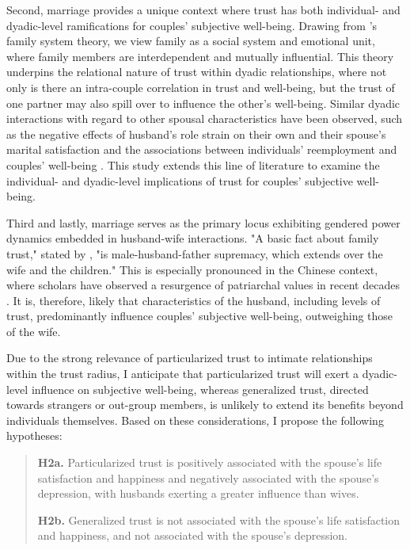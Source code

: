 Second, marriage provides a unique context where trust has both individual- and dyadic-level ramifications for couples' subjective well-being. Drawing from \citeauthor{bowenUseFamilyTheory1966}'s \citeyear{bowenUseFamilyTheory1966} family system theory, we view family as a social system and emotional unit, where family members are interdependent and mutually influential. This theory underpins the relational nature of trust within dyadic relationships, where not only is there an intra-couple correlation in trust and well-being, but the trust of one partner may also spill over to influence the other's well-being. Similar dyadic interactions with regard to other spousal characteristics have been observed, such as the negative effects of husband's role strain on their own and their spouse's marital satisfaction \parencite{brockLongitudinalInvestigationStress2008} and the associations between individuals' reemployment and couples' well-being \parencite{scheuringDoesFixedTermEmployment2021}. This study extends this line of literature to examine the individual- and dyadic-level implications of trust for couples' subjective well-being.

Third and lastly, marriage serves as the primary locus exhibiting gendered power dynamics embedded in husband-wife interactions. "A basic fact about family trust," stated by \textcite[p~27]{barberLogicLimitsTrust1983}, "is male-husband-father supremacy, which extends over the wife and the children." This is especially pronounced in the Chinese context, where scholars have observed a resurgence of patriarchal values in recent decades \parencite{jiUnequalCareUnequal2017}. It is, therefore, likely that characteristics of the husband, including levels of trust, predominantly influence couples' subjective well-being, outweighing those of the wife.

Due to the strong relevance of particularized trust to intimate relationships within the trust radius, I anticipate that particularized trust will exert a dyadic-level influence on subjective well-being, whereas generalized trust, directed towards strangers or out-group members, is unlikely to extend its benefits beyond individuals themselves. Based on these considerations, I propose the following hypotheses:

\begin{quote}
    \textbf{H2a.} Particularized trust is positively associated with the spouse's life satisfaction and happiness and negatively associated with the spouse's depression, with husbands exerting a greater influence than wives.

    \textbf{H2b.} Generalized trust is not associated with the spouse's life satisfaction and happiness, and not associated with the spouse's depression.
\end{quote}

